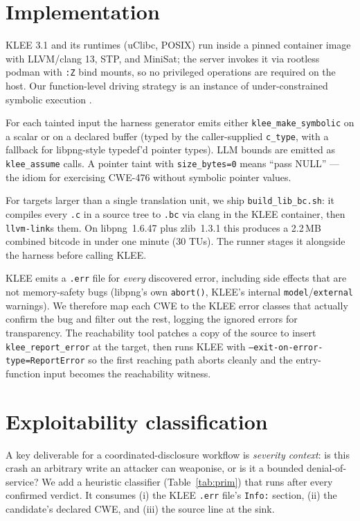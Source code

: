 \documentclass[3p,times,procedia]{elsarticle}
\begin{document}
\section{Implementation}
\label{sec:impl}

KLEE \cite{klee} 3.1 and its runtimes (uClibc, POSIX) run inside a pinned container image with LLVM/clang 13, STP, and MiniSat; the server invokes it via rootless podman with \texttt{:Z} bind mounts, so no privileged operations are required on the host. Our function-level driving strategy is an instance of under-constrained symbolic execution \cite{ucklee}.

For each tainted input the harness generator emits either \texttt{klee\_make\_symbolic} on a scalar or on a declared buffer (typed by the caller-supplied \texttt{c\_type}, with a fallback for libpng-style typedef'd pointer types). LLM bounds are emitted as \texttt{klee\_assume} calls. A pointer taint with \texttt{size\_bytes=0} means ``pass NULL'' --- the idiom for exercising CWE-476 without symbolic pointer values.

For targets larger than a single translation unit, we ship \texttt{build\_lib\_bc.sh}: it compiles every \texttt{.c} in a source tree to \texttt{.bc} via clang in the KLEE container, then \texttt{llvm-link}s them. On libpng~1.6.47 plus zlib~1.3.1 this produces a 2.2\,MB combined bitcode in under one minute (30 TUs). The runner stages it alongside the harness before calling KLEE.

KLEE emits a \texttt{.err} file for \emph{every} discovered error, including side effects that are not memory-safety bugs (libpng's own \texttt{abort()}, KLEE's internal \texttt{model}/\texttt{external} warnings). We therefore map each CWE to the KLEE error classes that actually confirm the bug and filter out the rest, logging the ignored errors for transparency. The reachability tool patches a copy of the source to insert \texttt{klee\_report\_error} at the target, then runs KLEE with \texttt{--exit-on-error-type=ReportError} so the first reaching path aborts cleanly and the entry-function input becomes the reachability witness.

\section{Exploitability classification}
\label{sec:exploit}

A key deliverable for a coordinated-disclosure workflow is \emph{severity context}: is this crash an arbitrary write an attacker can weaponise, or is it a bounded denial-of-service? We add a heuristic classifier (Table~\ref{tab:prim}) that runs after every confirmed verdict. It consumes (i) the KLEE \texttt{.err} file's \texttt{Info:} section, (ii) the candidate's declared CWE, and (iii) the source line at the sink.
\end{document}
